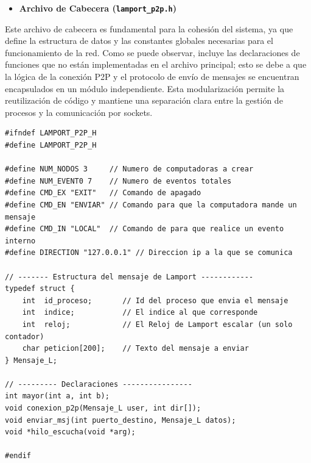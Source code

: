 \begin{itemize}
    \item \textbf{Archivo de Cabecera (\texttt{lamport\_p2p.h})}
\end{itemize}

Este archivo de cabecera es fundamental para la cohesión del sistema, ya que define la estructura de datos y las constantes globales necesarias para el funcionamiento de la red. Como se puede observar, incluye las declaraciones de funciones que no están implementadas en el archivo principal; esto se debe a que la lógica de la conexión P2P y el protocolo de envío de mensajes se encuentran encapsulados en un módulo independiente. Esta modularización permite la reutilización de código y mantiene una separación clara entre la gestión de procesos y la comunicación por sockets.

\begin{lstlisting}[style=estiloC]
#ifndef LAMPORT_P2P_H
#define LAMPORT_P2P_H

#define NUM_NODOS 3     // Numero de computadoras a crear
#define NUM_EVENT0 7    // Numero de eventos totales
#define CMD_EX "EXIT"   // Comando de apagado
#define CMD_EN "ENVIAR" // Comando para que la computadora mande un mensaje
#define CMD_IN "LOCAL"  // Comando de para que realice un evento interno
#define DIRECTION "127.0.0.1" // Direccion ip a la que se comunica

// ------- Estructura del mensaje de Lamport ------------
typedef struct {
    int  id_proceso;       // Id del proceso que envia el mensaje
    int  indice;           // El indice al que corresponde
    int  reloj;            // El Reloj de Lamport escalar (un solo contador)
    char peticion[200];    // Texto del mensaje a enviar
} Mensaje_L;

// --------- Declaraciones ----------------
int mayor(int a, int b);
void conexion_p2p(Mensaje_L user, int dir[]);
void enviar_msj(int puerto_destino, Mensaje_L datos);
void *hilo_escucha(void *arg);

#endif
\end{lstlisting}